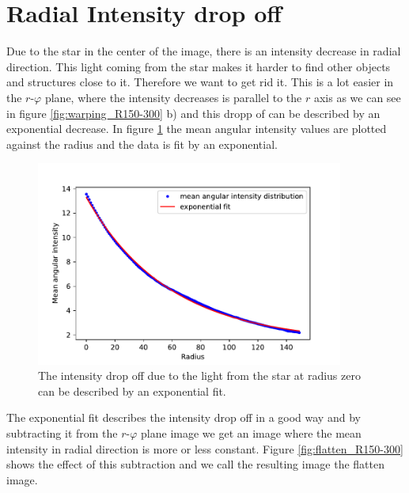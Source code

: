 \section{Radial Intensity drop off}
Due to the star in the center of the image, there is an intensity decrease in radial direction. This light coming from the star makes it harder to find other objects and structures close to it. Therefore we want to get rid it. This is a lot easier in the $r$-$\varphi$ plane, where the intensity decreases is parallel to the $r$ axis as we can see in figure \ref{fig:warping_R150-300} b) and this dropp of can be described by an exponential decrease. In figure \ref{fig:mean_angular_intensity_R150_300} the mean angular intensity values are plotted against the radius and the data is fit by an exponential.
\begin{figure}[H]
	\centering
		\includegraphics[width=0.9\textwidth]{pics/mean_angular_intensity_R150_300.pdf}
\caption{The intensity drop off due to the light from the star at radius zero can be described by an exponential fit.}
\label{fig:mean_angular_intensity_R150_300}
\end{figure}
The exponential fit describes the intensity drop off in a good way and by subtracting it from the $r$-$\varphi$ plane image we get an image where the mean intensity in radial direction is more or less constant. Figure \ref{fig:flatten_R150-300} shows the effect of this subtraction and we call the resulting image the flatten image.  
